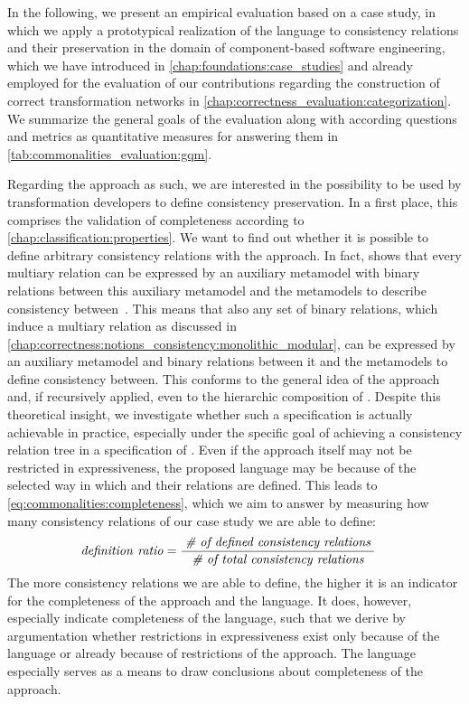 In the following, we present an empirical evaluation based on a case study, in which we apply a prototypical realization of the \commonalities language to consistency relations and their preservation in the domain of component-based software engineering, which we have introduced in \autoref{chap:foundations:case_studies} and already employed for the evaluation of our contributions regarding the construction of correct transformation networks in \autoref{chap:correctness_evaluation:categorization}.
We summarize the general goals of the evaluation along with according questions and metrics as quantitative measures for answering them in \autoref{tab:commonalities_evaluation:gqm}.

Regarding the \commonalities approach as such, we are interested in the possibility to be used by transformation developers to define consistency preservation.
In a first place, this comprises the validation of completeness according to \autoref{chap:classification:properties}.
We want to find out whether it is possible to define arbitrary consistency relations with the \commonalities approach. 
In fact, \citeauthor{stevens2020BidirectionalTransformationLarge-SoSym} shows that every multiary relation can be expressed by an auxiliary metamodel with binary relations between this auxiliary metamodel and the metamodels to describe consistency between~\cite{stevens2020BidirectionalTransformationLarge-SoSym}.
This means that also any set of binary relations, which induce a multiary relation as discussed in \autoref{chap:correctness:notions_consistency:monolithic_modular}, can be expressed by an auxiliary metamodel and binary relations between it and the metamodels to define consistency between.
This conforms to the general idea of the \commonalities approach and, if recursively applied, even to the hierarchic composition of \commonalities.
Despite this theoretical insight, we investigate whether such a specification is actually achievable in practice, especially under the specific goal of achieving a consistency relation tree in a specification of \commonalities.
Even if the \commonalities approach itself may not be restricted in expressiveness, the proposed \commonalities language may be because of the selected way in which \commonalities and their relations are defined.
This leads to \autoref{eq:commonalities:completeness}, which we aim to answer by measuring how many consistency relations of our case study we are able to define:
\begin{align*}
    &
    \mathit{definition\ ratio} = \frac{\; \textit{\# of defined consistency relations} \;}{\; \textit{\# of total consistency relations} \;}
\end{align*}
The more consistency relations we are able to define, the higher it is an indicator for the completeness of the approach and the language. 
It does, however, especially indicate completeness of the \commonalities language, such that we derive by argumentation whether restrictions in expressiveness exist only because of the language or already because of restrictions of the \commonalities approach.
The language especially serves as a means to draw conclusions about completeness of the approach.

